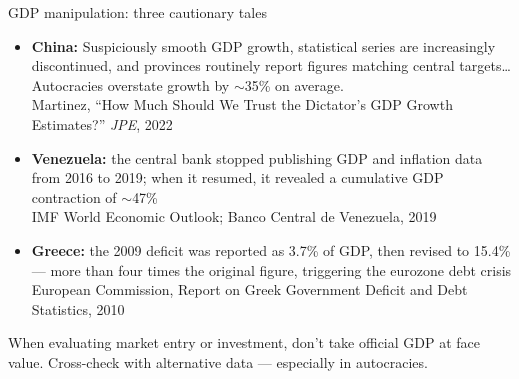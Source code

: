 \documentclass[aspectratio=169]{beamer}
\begin{document}
\begin{frame}[t]{GDP manipulation: three cautionary tales}
   \small
   \begin{itemize}
      \setlength\itemsep{0.1cm}
      \item \textbf{China:} Suspiciously smooth GDP growth, statistical series are increasingly discontinued, and provinces routinely report figures matching central targets\ldots Autocracies overstate growth by $\sim$35\% on average.
         \\{\scriptsize\textcolor{HECgray}{Martinez, ``How Much Should We Trust the Dictator's GDP Growth Estimates?'' \textit{JPE}, 2022}}
      \item \textbf{Venezuela:} the central bank stopped publishing GDP and inflation data from 2016 to 2019; when it resumed, it revealed a cumulative GDP contraction of $\sim$47\%
         \\{\scriptsize\textcolor{HECgray}{IMF World Economic Outlook; Banco Central de Venezuela, 2019}}
      \item \textbf{Greece:} the 2009 deficit was reported as 3.7\% of GDP, then revised to 15.4\% --- more than four times the original figure, triggering the eurozone debt crisis
         \\{\scriptsize\textcolor{HECgray}{European Commission, Report on Greek Government Deficit and Debt Statistics, 2010}}
   \end{itemize}
   \begin{bizimplication}
      \footnotesize When evaluating market entry or investment, don't take official GDP at face value. Cross-check with alternative data --- especially in autocracies.
   \end{bizimplication}
\end{frame}
\end{document}

